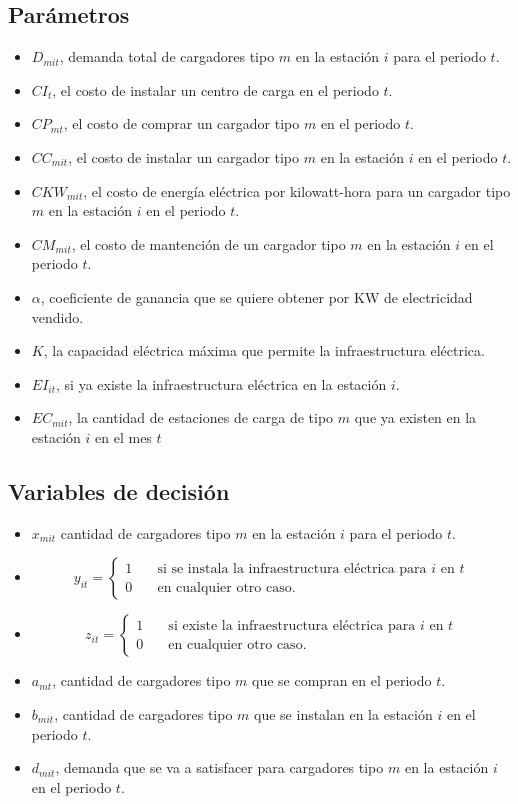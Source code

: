 \documentclass[letterpaper]{article}
\begin{document}
\begin{flushleft}
	\subsection{Parámetros}
	\begin{itemize}
		\item $D_{mit}$, demanda total de cargadores tipo $m$ en la estación $i$ para el periodo $t$.
		\item $CI_{t}$, el costo de instalar un centro de carga en el periodo $t$.
		\item $CP_{mt}$, el costo de comprar un cargador tipo $m$ en el periodo $t$.
		\item $CC_{mit}$, el costo de instalar un cargador tipo $m$ en la estación $i$ en el periodo $t$.
		\item $CKW_{mit}$, el costo de energía eléctrica por kilowatt-hora para un cargador tipo $m$ en la estación $i$ en el periodo $t$.
		\item $CM_{mit}$, el costo de mantención de un cargador tipo $m$ en la estación $i$ en el periodo $t$.
		\item $\alpha$, coeficiente de ganancia que se quiere obtener por KW de electricidad vendido.
		\item $K$, la capacidad eléctrica máxima que permite la infraestructura eléctrica.
		\item $EI_{it}$, si ya existe la infraestructura eléctrica en la estación $i$.
		\item $EC_{mit}$, la cantidad de estaciones de carga de tipo $m$ que ya existen en la estación $i$ en el mes $t$
	\end{itemize}
	\subsection{Variables de decisión}
	\begin{itemize}
		\item $x_{mit}$ cantidad de cargadores tipo $m$ en la estación $i$ para el periodo $t$.
		\item \[
			      y_{it} =
			      \begin{cases}
				      1 & \quad\text{si se instala la infraestructura eléctrica para }i\text{ en }t \\
				      0 & \quad\text{en cualquier otro caso.}
			      \end{cases}
		      \]
		\item \[
			      z_{it} =
			      \begin{cases}
				      1 & \quad\text{si existe la infraestructura eléctrica para }i\text{ en }t \\
				      0 & \quad\text{en cualquier otro caso.}
			      \end{cases}
		      \]
		\item $a_{mt}$, cantidad de cargadores tipo $m$ que se compran en el periodo $t$.
		\item $b_{mit}$, cantidad de cargadores tipo $m$ que se instalan en la estación $i$ en el periodo $t$.
		\item $d_{mit}$, demanda que se va a satisfacer para cargadores tipo $m$ en la estación $i$ en el periodo $t$.
	\end{itemize}

\end{flushleft}
\end{document}
